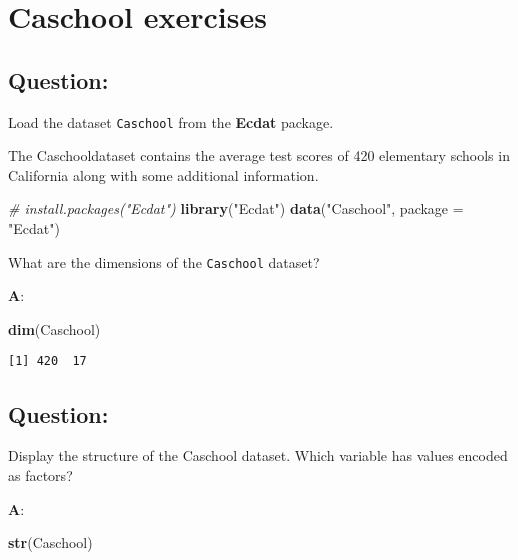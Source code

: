 \documentclass[12pt,]{article}
\newenvironment{Shaded}{\begin{snugshade}}{\end{snugshade}}
\newcommand{\CommentTok}[1]{\textcolor[rgb]{0.56,0.35,0.01}{\textit{#1}}}
\newcommand{\DataTypeTok}[1]{\textcolor[rgb]{0.13,0.29,0.53}{#1}}
\newcommand{\KeywordTok}[1]{\textcolor[rgb]{0.13,0.29,0.53}{\textbf{#1}}}
\newcommand{\NormalTok}[1]{#1}
\newcommand{\StringTok}[1]{\textcolor[rgb]{0.31,0.60,0.02}{#1}}
\begin{document}
\hypertarget{caschool-exercises}{%
\section{Caschool exercises}\label{caschool-exercises}}

\hypertarget{question}{%
\subsection{Question:}\label{question}}

Load the dataset \texttt{Caschool} from the \textbf{Ecdat} package.

The Caschooldataset contains the average test scores of 420 elementary
schools in California along with some additional information.

\begin{Shaded}
\begin{Highlighting}[]
\CommentTok{# install.packages("Ecdat")}
\KeywordTok{library}\NormalTok{(}\StringTok{"Ecdat"}\NormalTok{)}
\KeywordTok{data}\NormalTok{(}\StringTok{"Caschool"}\NormalTok{, }\DataTypeTok{package =} \StringTok{"Ecdat"}\NormalTok{)}
\end{Highlighting}
\end{Shaded}

What are the dimensions of the \texttt{Caschool} dataset?

\textbf{A}:

\begin{Shaded}
\begin{Highlighting}[]
\KeywordTok{dim}\NormalTok{(Caschool)}
\end{Highlighting}
\end{Shaded}

\begin{verbatim}
[1] 420  17
\end{verbatim}

\hypertarget{question-1}{%
\subsection{Question:}\label{question-1}}

Display the structure of the Caschool dataset. Which variable has values
encoded as factors?

\textbf{A}:

\begin{Shaded}
\begin{Highlighting}[]
\KeywordTok{str}\NormalTok{(Caschool)}
\end{Highlighting}
\end{Shaded}
\end{document}
